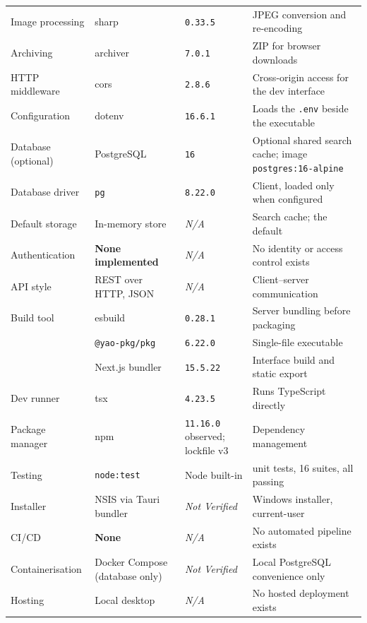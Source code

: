 \documentclass[11pt,a4paper]{report}
\newcommand{\code}[1]{\texttt{\small #1}}
\DeclareRobustCommand{\file}[1]{{\small\nolinkurl{#1}}}
\newcommand{\ver}[1]{\texttt{#1}}
\newcommand{\nv}{\textcolor{cNote}{\textit{Not Verified}}}
\newcommand{\na}{\textcolor{cNote}{\textit{N/A}}}
\begin{document}
\begin{longtable}{@{}>{\raggedright\arraybackslash}p{3.0cm}>{\raggedright\arraybackslash}p{4.3cm}>{\raggedright\arraybackslash}p{2.6cm}>{\raggedright\arraybackslash}p{5.2cm}@{}}
Image processing     & sharp                   & \ver{0.33.5}  & JPEG conversion and re-encoding\\
Archiving            & archiver                & \ver{7.0.1}   & ZIP for browser downloads\\
HTTP middleware      & cors                    & \ver{2.8.6}   & Cross-origin access for the dev interface\\
Configuration        & dotenv                  & \ver{16.6.1}  & Loads the \file{.env} beside the executable\\
Database (optional)  & PostgreSQL              & \ver{16} & Optional shared search cache; image \code{postgres:16-alpine}\\
Database driver      & \code{pg}               & \ver{8.22.0}  & Client, loaded only when configured\\
Default storage      & In-memory store         & \na           & Search cache; the default\\
Authentication       & \textbf{None implemented} & \na         & No identity or access control exists\\
API style            & REST over HTTP, JSON    & \na           & Client--server communication\\
Build tool           & esbuild                 & \ver{0.28.1}  & Server bundling before packaging\\
                     & \code{@yao-pkg/pkg}     & \ver{6.22.0}  & Single-file executable\\
                     & Next.js bundler         & \ver{15.5.22} & Interface build and static export\\
Dev runner           & tsx                     & \ver{4.23.5}  & Runs TypeScript directly\\
Package manager      & npm                     & \ver{11.16.0} observed; lockfile v3 & Dependency management\\
Testing              & \code{node:test}        & Node built-in & 122 unit tests, 16 suites, all passing\\
Installer            & NSIS via Tauri bundler  & \nv           & Windows installer, current-user\\
CI/CD                & \textbf{None}           & \na           & No automated pipeline exists\\
Containerisation     & Docker Compose (database only) & \nv    & Local PostgreSQL convenience only\\
Hosting              & Local desktop           & \na           & No hosted deployment exists\\
\end{longtable}
\end{document}
